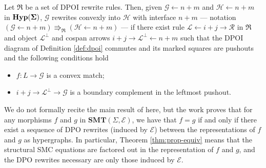 \begin{definition}
\label{def:convex_dpo}
Let $\mathfrak{R}$ be a set of DPOI rewrite rules. 
Then, given $\mathcal G \xleftarrow{} n+m$ and $\mathcal H \xleftarrow{} n + m$ in $\mathbf{Hyp(\Sigma)}$, $\mathcal G$ rewrites convexly into $\mathcal H$ with interface $n + m$ --- notation $(\mathcal G \xleftarrow{} n + m ) \Rrightarrow_{\mathfrak{R}}  (\mathcal H \xleftarrow{} n + m )$ --- if there exist rule $\mathcal L \xleftarrow{} i + j \xrightarrow{} \mathcal R$ in $\mathfrak{R}$ and object $\mathcal{L}^{\bot}$ and cospan arrows $i+j \xrightarrow{} \mathcal{L}^{\bot} \xleftarrow{} n+m$ such that the DPOI diagram of Definition \ref{def:dpoi} commutes and its marked squares are pushouts 
and the following conditions hold
\begin{itemize}
    \item $f : L \to \mathcal G$ is a convex match;
    \item $i + j \to \mathcal{L}^{\bot} \to \mathcal G$ is a boundary complement in the leftmost pushout.
\end{itemize}
\end{definition}
We do not formally recite the main result of \cite{bonchi_string_2022-2} here,  but the work proves that for any morphisms $f$ and $g$ in $\mathbf{SMT}(\Sigma, \mathcal{E})$,  we have that $f = g$ if and only if there exist a sequence of DPO rewrites (induced by $\mathcal{E}$) between the representations of $f$ and $g$ as hypergraphs.  In particular,  Theorem \ref{thm:prop-equiv} means that the structural SMC equations are factored out in the representation of $f$ and $g$,  and the DPO rewrites necessary are only those induced by $\mathcal{E}$. 
